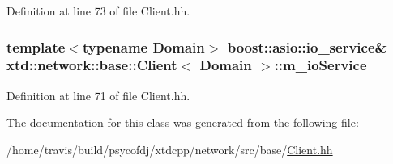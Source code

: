 Definition at line 73 of file Client.\-hh.

\hypertarget{classxtd_1_1network_1_1base_1_1Client_ae3945e4771a207872ab45b73de2e040f}{
\subsubsection[{m\-\_\-io\-Service}]{\setlength{\rightskip}{0pt plus 5cm}template$<$typename Domain$>$ boost\-::asio\-::io\-\_\-service\& {\bf xtd\-::network\-::base\-::\-Client}$<$ Domain $>$\-::m\-\_\-io\-Service\hspace{0.3cm}{\ttfamily [protected]}}}\label{classxtd_1_1network_1_1base_1_1Client_ae3945e4771a207872ab45b73de2e040f}


Definition at line 71 of file Client.\-hh.



The documentation for this class was generated from the following file\-:\begin{DoxyCompactItemize}
\item 
/home/travis/build/psycofdj/xtdcpp/network/src/base/\hyperlink{base_2Client_8hh}{Client.\-hh}\end{DoxyCompactItemize}
